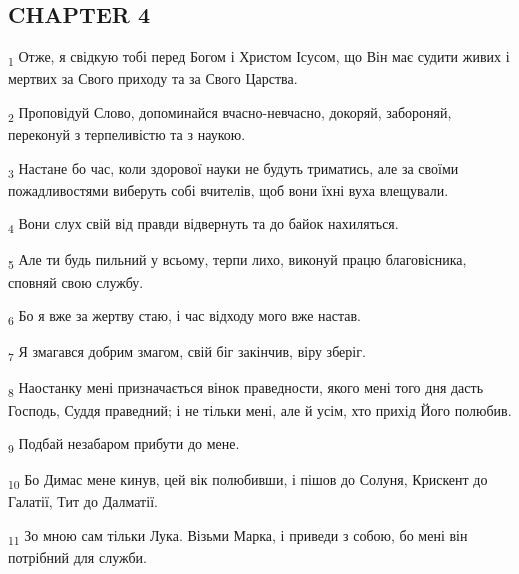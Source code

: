 \subsection{CHAPTER 4}
\begin{tcolorbox}
\textsubscript{1} Отже, я свідкую тобі перед Богом і Христом Ісусом, що Він має судити живих і мертвих за Свого приходу та за Свого Царства.
\end{tcolorbox}
\begin{tcolorbox}
\textsubscript{2} Проповідуй Слово, допоминайся вчасно-невчасно, докоряй, забороняй, переконуй з терпеливістю та з наукою.
\end{tcolorbox}
\begin{tcolorbox}
\textsubscript{3} Настане бо час, коли здорової науки не будуть триматись, але за своїми пожадливостями виберуть собі вчителів, щоб вони їхні вуха влещували.
\end{tcolorbox}
\begin{tcolorbox}
\textsubscript{4} Вони слух свій від правди відвернуть та до байок нахиляться.
\end{tcolorbox}
\begin{tcolorbox}
\textsubscript{5} Але ти будь пильний у всьому, терпи лихо, виконуй працю благовісника, сповняй свою службу.
\end{tcolorbox}
\begin{tcolorbox}
\textsubscript{6} Бо я вже за жертву стаю, і час відходу мого вже настав.
\end{tcolorbox}
\begin{tcolorbox}
\textsubscript{7} Я змагався добрим змагом, свій біг закінчив, віру зберіг.
\end{tcolorbox}
\begin{tcolorbox}
\textsubscript{8} Наостанку мені призначається вінок праведности, якого мені того дня дасть Господь, Суддя праведний; і не тільки мені, але й усім, хто прихід Його полюбив.
\end{tcolorbox}
\begin{tcolorbox}
\textsubscript{9} Подбай незабаром прибути до мене.
\end{tcolorbox}
\begin{tcolorbox}
\textsubscript{10} Бо Димас мене кинув, цей вік полюбивши, і пішов до Солуня, Крискент до Галатії, Тит до Далматії.
\end{tcolorbox}
\begin{tcolorbox}
\textsubscript{11} Зо мною сам тільки Лука. Візьми Марка, і приведи з собою, бо мені він потрібний для служби.
\end{tcolorbox}
